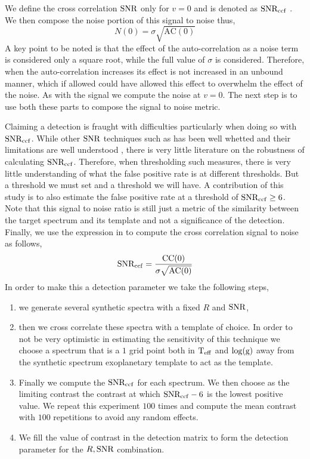 We define the cross correlation $\rm{SNR}$ only for $v=0$ and is denoted as $\rm{SNR_{ccf}}$ .
We then compose the noise portion of this signal to noise thus,
\begin{equation}
    N(0) = \sigma \sqrt{\textrm{AC}(0)}
\end{equation}
A key point to be noted is that the effect of the auto-correlation as a noise term is considered only a square root, while the full value of $\sigma$ is considered.
Therefore, when the auto-correlation increases its effect is not increased in an unbound manner, which if allowed could have allowed this effect to overwhelm the effect of the noise.
As with the signal we compute the noise at $v=0$.
The next step is to use both these parts to compose the signal to noise metric.

Claiming a detection is fraught with difficulties particularly when doing so with $\rm{SNR_{ccf}}$.
While other $\rm{SNR}$ techniques such as \cite{2014MawetSNR} has been well whetted and their limitations are well understood \citep[e.g STIM][]{2019Pairet}, there is very little literature on the robustness of calculating $\rm{SNR_{ccf}}$.
Therefore, when thresholding such measures, there is very little understanding of what the false positive rate is at different thresholds.
But a threshold we must set and a threshold we will have.
A contribution of this study is to also estimate the false positive rate at a threshold of $\rm{SNR_{ccf}}\ge 6$.
Note that this signal to noise ratio is still just a metric of the similarity between the target spectrum and its template and not a significance of the detection.
Finally, we use the expression in \cite{ruffio2019radial} to compute the cross correlation signal to noise as follows,
\begin{equation}
    \rm{SNR_{ccf}}=\frac{CC(0)}{\sigma \sqrt{\textrm{AC}(0)}}
    \label{eq:ccf-snr}
\end{equation}
In order to make this a detection parameter we take the following steps,
\begin{enumerate}
    \item we generate several synthetic spectra with a fixed $R$ and $\rm{SNR}$,
    \item then we cross correlate these spectra with a template of choice. In order to not be very optimistic in estimating the sensitivity of this technique we choose a spectrum that is a $1$ grid point both in $\rm{T_{eff}}$ and $\rm{\log(g)}$ away from the synthetic spectrum exoplanetary template to act as the template.
    \item Finally we compute the $\rm{SNR_{ccf}}$ for each spectrum. We then choose as the limiting contrast the contrast at which $\rm{SNR_{ccf}}-6$ is the lowest positive value.
    We repeat this experiment $100$ times and compute the mean contrast with $100$ repetitions to avoid any random effects.
    \item We fill the value of contrast in the detection matrix to form the detection parameter for the $R,\rm{SNR}$ combination.
\end{enumerate}

